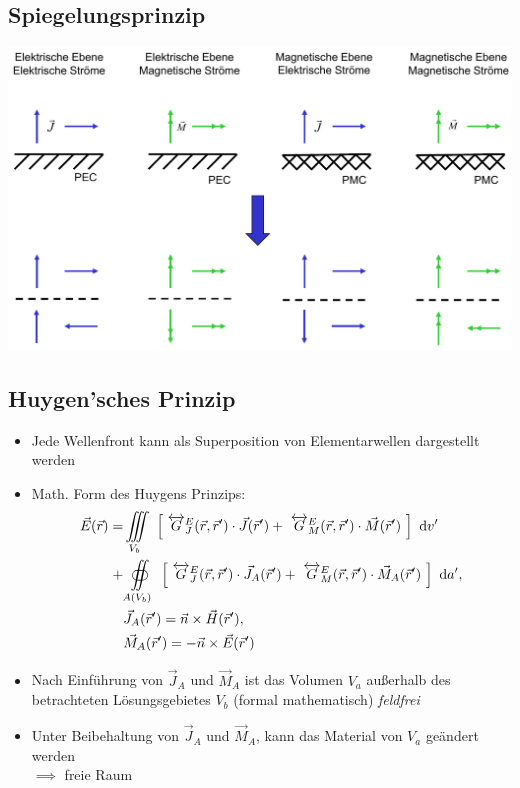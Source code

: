 {\subsection{Spiegelungsprinzip}
\includegraphics[width = 0.35\paperheight]{content/fuw/pictures/fuw_spiegelungsprinzip.png}
\subsection{Huygen'sches Prinzip}
\begin{itemize}
    \itemsep0pt
    \item Jede Wellenfront kann als Superposition von Elementarwellen dargestellt werden
    \item Math. Form des Huygens Prinzips:
        \begin{align*}
            \vec{E}(\vec{r}) = &\iiint\limits_{V_b}\
            \left[\
            \overleftrightarrow{G}^E_J(\vec{r},\vec{r}^\prime)\cdot\vec{J}(\vec{r}^\prime) +\
            \overleftrightarrow{G}^E_M(\vec{r},\vec{r}^\prime)\cdot\vec{M}(\vec{r}^\prime)\
            \right]\
            \mathrm{d}v^\prime\\
            + &\oiint\limits_{A(V_b)}\
            \left[\
            \overleftrightarrow{G}^E_J(\vec{r},\vec{r}^\prime)\cdot\vec{J}_A(\vec{r}^\prime) +\
            \overleftrightarrow{G}^E_M(\vec{r},\vec{r}^\prime)\cdot\vec{M}_A(\vec{r}^\prime)\
            \right]\
            \mathrm{d}a^\prime,\\
            &\vec{J}_A(\vec{r}^\prime) = \vec{n} \times \vec{H}(\vec{r}^\prime),\\
            &\vec{M}_A(\vec{r}^\prime) = -\vec{n} \times \vec{E}(\vec{r}^\prime)\\
        \end{align*}
    \item Nach Einführung von $\vec{J}_A$ und $\vec{M}_A$ ist das Volumen $V_a$ außerhalb des betrachteten Lösungsgebietes $V_b$ (formal mathematisch) \textit{feldfrei}
    \item Unter Beibehaltung von $\vec{J}_A$ und $\vec{M}_A$, kann das Material von $V_a$ geändert werden\\
        $\implies$ freie Raum
\end{itemize}
}

